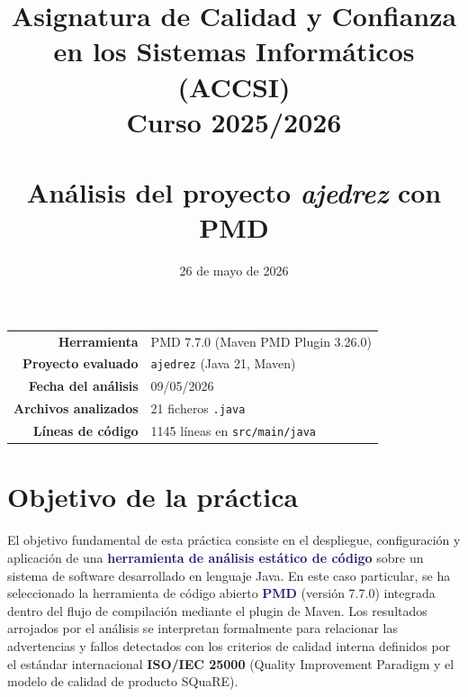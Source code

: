 \documentclass[12pt,a4paper]{article}
\title{
    \vspace{-1.5cm}
    {\large Asignatura de Calidad y Confianza en los Sistemas Informáticos (ACCSI)} \\[0.4em]
    {\large Curso 2025/2026} \\[1.5em]
    \textbf{\color{MidnightBlue}{Práctica 4: Herramientas de análisis estático de código}} \\[0.4em]
    {\large Análisis del proyecto \emph{ajedrez} con PMD}
}
\author{\key{Iván Rodríguez Miranda}}
\date{26 de mayo de 2026}
\newcommand{\key}[1]{\textbf{\textcolor{MidnightBlue}{#1}}}
\newcommand{\norma}[1]{\textbf{\textcolor{BrickRed}{#1}}}
\begin{document}
\maketitle
\thispagestyle{empty}

\begin{center}
\begin{tabular}{rl}
\toprule
\textbf{Herramienta} & PMD 7.7.0 (Maven PMD Plugin 3.26.0) \\
\textbf{Proyecto evaluado} & \texttt{ajedrez} (Java 21, Maven) \\
\textbf{Fecha del análisis} & 09/05/2026 \\
\textbf{Archivos analizados} & 21 ficheros \texttt{.java} \\
\textbf{Líneas de código} & 1145 líneas en \texttt{src/main/java} \\
\bottomrule
\end{tabular}
\end{center}

\vspace{1em}
\tableofcontents
\newpage

\section{Objetivo de la práctica}

El objetivo fundamental de esta práctica consiste en el despliegue, configuración y aplicación de una \key{herramienta de análisis estático de código} sobre un sistema de software desarrollado en lenguaje Java. En este caso particular, se ha seleccionado la herramienta de código abierto \key{PMD} (versión 7.7.0) integrada dentro del flujo de compilación mediante el plugin de Maven. Los resultados arrojados por el análisis se interpretan formalmente para relacionar las advertencias y fallos detectados con los criterios de calidad interna definidos por el estándar internacional \norma{ISO/IEC 25000} (Quality Improvement Paradigm y el modelo de calidad de producto SQuaRE).
\end{document}
